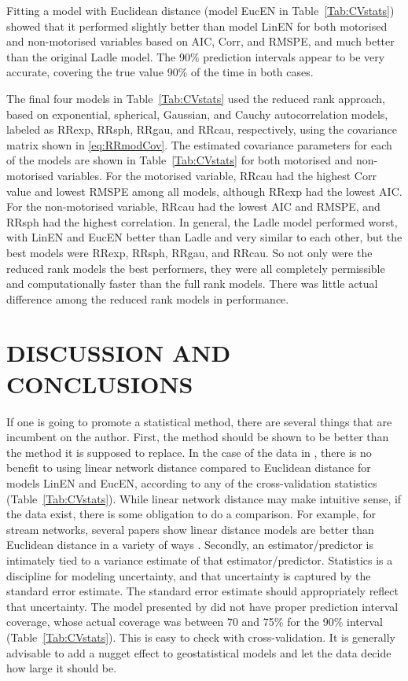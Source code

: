 \documentclass[11pt, titlepage]{article}\usepackage[]{graphicx}\usepackage[]{color}
\begin{document}
\begin{spacing}{1.9}
\begin{flushleft}
Fitting a model with Euclidean distance (model EucEN in Table~\ref{Tab:CVstats}) showed that it performed slightly better than model LinEN for both motorised and non-motorised variables based on AIC, Corr, and RMSPE, and much better than the original Ladle model. The 90\% prediction intervals appear to be very accurate, covering the true value 90\% of the time in both cases.

The final four models in Table~\ref{Tab:CVstats} used the reduced rank approach, based on exponential, spherical, Gaussian, and Cauchy autocorrelation models, labeled as RRexp, RRsph, RRgau, and RRcau, respectively, using the covariance matrix shown in \ref{eq:RRmodCov}.  The estimated covariance parameters for each of the models are shown in Table~\ref{Tab:CVstats} for both motorised and non-motorised variables.  For the motorised variable, RRcau had the highest Corr value and lowest RMSPE among all models, although RRexp had the lowest AIC. For the non-motorised variable, RRcau had the lowest AIC and RMSPE, and RRsph had the highest correlation.  In general, the Ladle model performed worst, with LinEN and EucEN better than Ladle and very similar to each other, but the best models were RRexp, RRsph, RRgau, and RRcau.  So not only were the reduced rank models the best performers, they were all completely permissible and computationally faster than the full rank models.  There was little actual difference among the reduced rank models in performance.

\section*{DISCUSSION AND CONCLUSIONS}

If one is going to promote a statistical method, there are several things that are incumbent on the author.  First, the method should be shown to be better than the method it is supposed to replace.  In the case of the data in \citet{Ladl:Avga:Whea:Boyc:pred:2016}, there is no benefit to using linear network distance compared to Euclidean distance for models LinEN and EucEN, according to any of the cross-validation statistics (Table~\ref{Tab:CVstats}).  While linear network distance may make intuitive sense, if the data exist, there is some obligation to do a comparison.  For example, for stream networks, several papers show linear distance models are better than Euclidean distance in a variety of ways \citep{Pete:Ver:Isaa:stre:2013,Isaa:Pete:Ver:Weng:Appl:2014,Rush:Pete:Ver:Bowm:2015}.  Secondly, an estimator/predictor is intimately tied to a variance estimate of that estimator/predictor.  Statistics is a discipline for modeling uncertainty, and that uncertainty is captured by the standard error estimate.  The standard error estimate should appropriately reflect that uncertainty.  The model presented by \citet{Ladl:Avga:Whea:Boyc:pred:2016} did not have proper prediction interval coverage, whose actual coverage was between 70 and 75\% for the 90\% interval (Table~\ref{Tab:CVstats}). This is easy to check with cross-validation.  It is generally advisable to add a nugget effect to geostatistical models and let the data decide how large it should be.


\end{flushleft}
\end{spacing}
\end{document}
